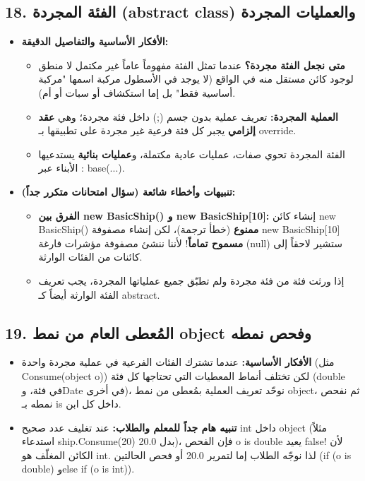\documentclass[14pt]{extarticle}
\begin{document}
\subsection*{18. الفئة المجردة (\textenglish{abstract class}) والعمليات المجردة}
\begin{itemize}[itemsep=0.3em]
    \item \textbf{الأفكار الأساسية والتفاصيل الدقيقة:}
    \begin{itemize}
        \item \textbf{متى نجعل الفئة مجردة؟} عندما تمثل الفئة مفهوماً عاماً غير مكتمل لا منطق لوجود كائن مستقل منه في الواقع (لا يوجد في الأسطول مركبة اسمها "مركبة أساسية فقط" بل إما استكشاف أو سبات أو أم).
        \item \textbf{العملية المجردة:} تعريف عملية بدون جسم (\textenglish{;}) داخل فئة مجردة؛ وهي \textbf{عقد إلزامي} يجبر كل فئة فرعية غير مجردة على تطبيقها بـ \textenglish{override}.
        \item الفئة المجردة تحوي صفات، عمليات عادية مكتملة، و\textbf{عمليات بنائية} يستدعيها الأبناء عبر \textenglish{: base(...)}.
    \end{itemize}
    \item \textbf{تنبيهات وأخطاء شائعة (سؤال امتحانات متكرر جداً):}
    \begin{itemize}
        \item \textbf{الفرق بين \textenglish{new BasicShip()} و \textenglish{new BasicShip[10]}:} إنشاء كائن \textenglish{new BasicShip()} \textbf{ممنوع} (خطأ ترجمة)، لكن إنشاء مصفوفة \textenglish{new BasicShip[10]} \textbf{مسموح تماماً}! لأننا ننشئ مصفوفة مؤشرات فارغة (\textenglish{null}) ستشير لاحقاً إلى كائنات من الفئات الوارثة.
        \item إذا ورثت فئة من فئة مجردة ولم تطبّق جميع عملياتها المجردة، يجب تعريف الفئة الوارثة أيضاً كـ \textenglish{abstract}.
    \end{itemize}
\end{itemize}

\filbreak
\subsection*{19. المُعطى العام من نمط \textenglish{object} وفحص نمطه}
\begin{itemize}[itemsep=0.3em]
    \item \textbf{الأفكار الأساسية:} عندما تشترك الفئات الفرعية في عملية مجردة واحدة (مثل \textenglish{Consume(object o)}) لكن تختلف أنماط المعطيات التي تحتاجها كل فئة (\textenglish{double} في فئة، و\textenglish{Date} في أخرى)، نوحّد تعريف العملية بمُعطى من نمط \textenglish{object}، ثم نفحص نمطه بـ \textenglish{is} داخل كل ابن.
    \item \textbf{تنبيه هام جداً للمعلم والطلاب:} عند تغليف عدد صحيح \textenglish{int} داخل \textenglish{object} (مثلاً استدعاء \textenglish{ship.Consume(20)} بدل \textenglish{20.0})، فإن الفحص \textenglish{o is double} يعيد \textenglish{false}! لأن الكائن المغلّف هو \textenglish{int}. لذا نوجّه الطلاب إما لتمرير \textenglish{20.0} أو فحص الحالتين (\textenglish{if (o is double)} و\textenglish{else if (o is int)}).
\end{itemize}
\end{document}
